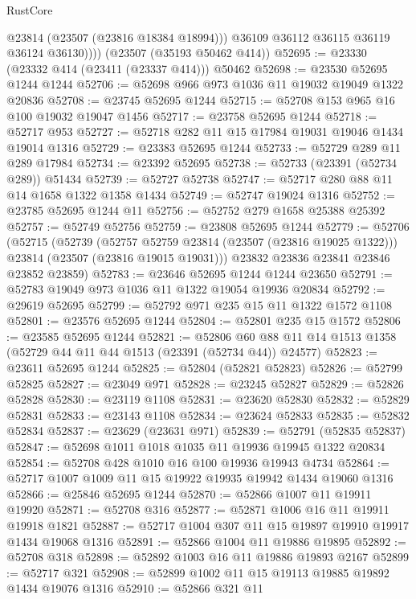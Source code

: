 \begin{lexlean}{RustCore}
\begin{coremodule}
              @23814
              (@23507 (@23816 @18384 @18994)))
            @36109
            @36112
            @36115
            @36119
            @36124
            @36130))))
    (@23507 (@35193 @50462 @414))
@52695 := @23330 (@23332 @414 (@23411 (@23337 @414))) @50462
@52698 := @23530 @52695 @1244 @1244
@52706 := @52698 @966 @973 @1036 @11 @19032 @19049 @1322 @20836
@52708 := @23745 @52695 @1244
@52715 := @52708 @153 @965 @16 @100 @19032 @19047 @1456
@52717 := @23758 @52695 @1244
@52718 := @52717 @953
@52727 := @52718 @282 @11 @15 @17984 @19031 @19046 @1434 @19014 @1316
@52729 := @23383 @52695 @1244
@52733 := @52729 @289 @11 @289 @17984
@52734 := @23392 @52695
@52738 := @52733 (@23391 (@52734 @289)) @51434
@52739 := @52727 @52738
@52747 := @52717 @280 @88 @11 @14 @1658 @1322 @1358 @1434
@52749 := @52747 @19024 @1316
@52752 := @23785 @52695 @1244 @11
@52756 := @52752 @279 @1658 @25388 @25392
@52757 := @52749 @52756
@52759 := @23808 @52695 @1244
@52779 := @52706
    (@52715
      (@52739
        (@52757 @52759 @23814 (@23507 (@23816 @19025 @1322)))
        @23814
        (@23507 (@23816 @19015 @19031)))
      @23832
      @23836
      @23841
      @23846
      @23852
      @23859)
@52783 := @23646 @52695 @1244 @1244 @23650
@52791 := @52783 @19049 @973 @1036 @11 @1322 @19054 @19936 @20834
@52792 := @29619 @52695
@52799 := @52792 @971 @235 @15 @11 @1322 @1572 @1108
@52801 := @23576 @52695 @1244
@52804 := @52801 @235 @15 @1572
@52806 := @23585 @52695 @1244
@52821 := @52806 @60 @88 @11 @14 @1513 @1358 (@52729 @44 @11 @44 @1513 (@23391 (@52734 @44)) @24577)
@52823 := @23611 @52695 @1244
@52825 := @52804 (@52821 @52823)
@52826 := @52799 @52825
@52827 := @23049 @971
@52828 := @23245 @52827
@52829 := @52826 @52828
@52830 := @23119 @1108
@52831 := @23620 @52830
@52832 := @52829 @52831
@52833 := @23143 @1108
@52834 := @23624 @52833
@52835 := @52832 @52834
@52837 := @23629 (@23631 @971)
@52839 := @52791 (@52835 @52837)
@52847 := @52698 @1011 @1018 @1035 @11 @19936 @19945 @1322 @20834
@52854 := @52708 @428 @1010 @16 @100 @19936 @19943 @4734
@52864 := @52717 @1007 @1009 @11 @15 @19922 @19935 @19942 @1434 @19060 @1316
@52866 := @25846 @52695 @1244
@52870 := @52866 @1007 @11 @19911 @19920
@52871 := @52708 @316
@52877 := @52871 @1006 @16 @11 @19911 @19918 @1821
@52887 := @52717 @1004 @307 @11 @15 @19897 @19910 @19917 @1434 @19068 @1316
@52891 := @52866 @1004 @11 @19886 @19895
@52892 := @52708 @318
@52898 := @52892 @1003 @16 @11 @19886 @19893 @2167
@52899 := @52717 @321
@52908 := @52899 @1002 @11 @15 @19113 @19885 @19892 @1434 @19076 @1316
@52910 := @52866 @321 @11

\end{coremodule}
\end{lexlean}
